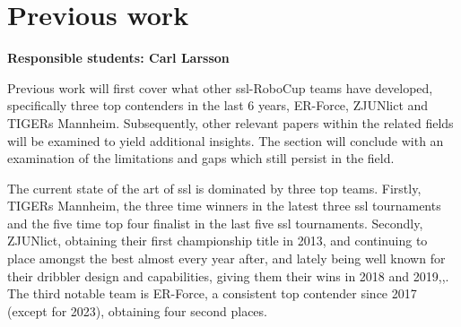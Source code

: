 \section{Previous work}
\label{section:previous_work}


\textbf{Responsible students: Carl Larsson}


Previous work will first cover what other \ac{ssl}-RoboCup teams have developed, specifically three top contenders in the last 6 years, ER-Force, ZJUNlict and TIGERs Mannheim. Subsequently, other relevant papers within the related fields will be examined to yield additional insights. The section will conclude with an examination of the limitations and gaps which still persist in the field.


The current state of the art of \ac{ssl} is dominated by three top teams. Firstly, TIGERs Mannheim, the three time winners in the latest three \ac{ssl} tournaments and the five time top four finalist in the last five \ac{ssl} tournaments\:\cite{robocup_small_size_league_hall_2023}. Secondly, ZJUNlict, obtaining their first championship title in 2013, and continuing to place amongst the best almost every year after, and lately being well known for their dribbler design and capabilities, giving them their wins in 2018 and 2019\:\cite{robocup_small_size_league_hall_2023},\cite{ommer_extended_2024},\cite{huang_zjunlict_2019}. The third notable team is ER-Force, a consistent top contender since 2017 (except for 2023), obtaining four second places\:\cite{robocup_small_size_league_hall_2023}.

